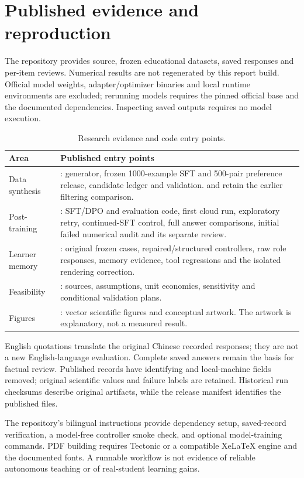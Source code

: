 \section{Published evidence and reproduction}
The repository provides source, frozen educational datasets, saved responses and per-item reviews. Numerical results are not regenerated by this report build. Official model weights, adapter/optimizer binaries and local runtime environments are excluded; rerunning models requires the pinned official base and the documented dependencies. Inspecting saved outputs requires no model execution.
\begin{table}[htbp]\centering\small
\caption{Research evidence and code entry points.}
\begin{tabularx}{\linewidth}{@{}p{30mm}Y@{}}\toprule
Area & Published entry points\\\midrule
Data synthesis & : generator, frozen 1000-example SFT and 500-pair preference release, candidate ledger and validation.  and  retain the earlier filtering comparison.\\
Post-training & : SFT/DPO and evaluation code, first cloud run, exploratory retry, continued-SFT control, full answer comparisons, initial failed numerical audit and its separate review.\\
Learner memory & : original frozen cases, repaired/structured controllers, raw role responses, memory evidence, tool regressions and the isolated rendering correction.\\
Feasibility & : sources, assumptions, unit economics, sensitivity and conditional validation plans.\\
Figures & : vector scientific figures and conceptual artwork. The artwork is explanatory, not a measured result.\\\bottomrule
\end{tabularx}\end{table}\FloatBarrier
English quotations translate the original Chinese recorded responses; they are not a new English-language evaluation. Complete saved answers remain the basis for factual review. Published records have identifying and local-machine fields removed; original scientific values and failure labels are retained. Historical run checksums describe original artifacts, while the release manifest identifies the published files.

The repository's bilingual instructions provide dependency setup, saved-record verification, a model-free controller smoke check, and optional model-training commands. PDF building requires Tectonic or a compatible XeLaTeX engine and the documented fonts. A runnable workflow is not evidence of reliable autonomous teaching or of real-student learning gains.
